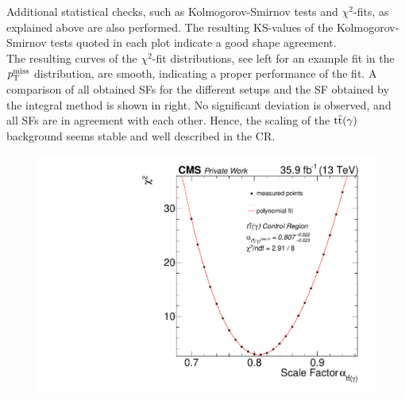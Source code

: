 Additional statistical checks, such as Kolmogorov-Smirnov tests and $\chi^2$-fits, as explained above are also performed. The resulting KS-values of the Kolmogorov-Smirnov tests quoted in each plot indicate a good shape agreement.\\
The resulting curves of the $\chi^2$-fit distributions, see  left for an example fit in the $p_{\mathrm{T}}^\text{miss}$ distribution, are smooth, indicating a proper performance of the fit. A comparison of all obtained SFs for the different setups and the SF obtained by the integral method is shown in  right. No significant deviation is observed, and all SFs are in agreement with each other. Hence, the scaling of the ${\mathrm{t}\overline{\mathrm{t}}}(\gamma)$ background seems stable and well described in the CR.
\begin{figure}[tbp]
 \centering
 \includegraphics[width=\pairwidth]{figures/plots_CR/chi/TT_met}

\end{figure}
